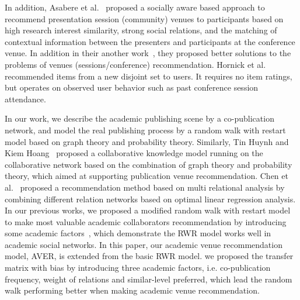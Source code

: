 \documentclass[9pt]{acm_proc_article-sp}
\begin{document}
In addition, Asabere et al.~\cite{asabere2014improving} proposed a socially aware based approach to recommend presentation session (community) venues to participants based on high research interest similarity, strong social relations, and the matching of contextual information between the presenters and participants at the conference venue. In addition in their another work~\cite{xia2013socially}, they proposed better solutions to the problems of venues (sessions/conference) recommendation. Hornick et al.~\cite{hornick2012extending} recommended items from a new disjoint set to users. It requires no item ratings, but operates on observed user behavior such as past conference session attendance.

In our work, we describe the academic publishing scene by a co-publication network, and model the real publishing process by a random walk with restart model based on graph theory and probability theory. Similarly, Tin Huynh and Kiem Hoang~\cite{huynh2012modeling} proposed a collaborative knowledge model running on the collaborative network based on the combination of graph theory and probability theory, which aimed at supporting publication venue recommendation. Chen et al.~\cite{chen2012social} proposed a recommendation method based on multi relational analysis by combining different relation networks based on optimal linear regression analysis. In our previous works, we proposed a modified random walk with restart model to make most valuable academic collaborators recommendation by introducing some academic factors~\cite{xia2014mvcwalker}, which demonstrate the RWR model works well in academic social networks. In this paper, our academic venue recommendation model, AVER, is extended from the basic RWR model. we proposed the transfer matrix with bias by introducing three academic factors, i.e. co-publication frequency, weight of relations and similar-level preferred, which lead the random walk performing better when making academic venue recommendation.
\end{document}
